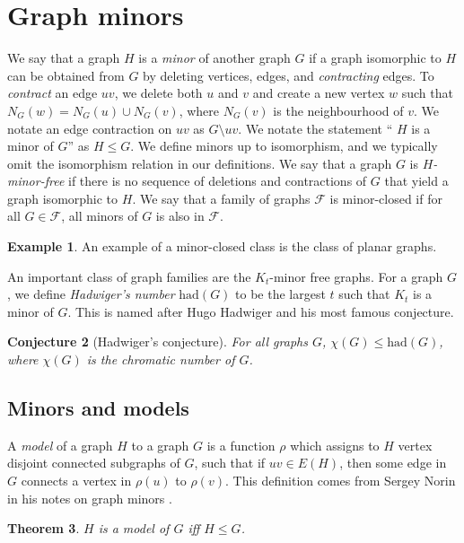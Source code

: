 \documentclass[]{report}
\newcommand{\had}{\text{had}}
\newtheorem{theorem}{Theorem}
\newtheorem{conjecture}[theorem]{Conjecture}
\theoremstyle{definition}
\newtheorem{example}[theorem]{Example}
\numberwithin{theorem}{section}
\numberwithin{equation}{section}
\begin{document}
\section{Graph minors}\label{sec:Graph Minors}
We say that a graph $H$ is a \textit{minor} of another graph $G$ if a graph isomorphic to $H$ can be obtained from $G$ by deleting vertices, edges, and \textit{contracting} edges. To \textit{contract} an edge $uv$, we delete both $u$ and $v$ and create a new vertex $w$ such that $N_G(w) = N_G(u) \cup N_G(v)$, where $N_G(v)$ is the neighbourhood of $v$. We notate an edge contraction on $uv$ as $G\setminus uv$.
We notate the statement `` $H$ is a minor of $G$'' as $H \leq G$. 
We define minors up to isomorphism, and we typically omit the isomorphism relation in our definitions. We say that a graph $G$ is \textit{$H$-minor-free} if there is no sequence of deletions and contractions of $G$ that yield a graph isomorphic to $H$. We say that a family of graphs $\mathcal{F}$ is minor-closed if for all $G \in \mathcal{F}$, all minors of $G$ is also in $\mathcal{F}$. 

\begin{example}
	An example of a minor-closed class is the class of planar graphs. 
\end{example}

An important class of graph families are the $K_t$-minor free graphs. For a graph $G$, we define \textit{Hadwiger's number} $\had(G)$ to be the largest $t$ such that $K_t$ is a minor of $G$. This is named after Hugo Hadwiger and his most famous conjecture.

\begin{conjecture}[Hadwiger's conjecture]\cite{hadwigerUeberKlassifikationStreckenkomplexe1943}
	For all graphs $G$, $\chi(G) \leq \had(G)$, where $\chi(G)$ is the \textit{chromatic number} of $G$. 
\end{conjecture}

\subsection{Minors and models}
A \textit{model} of a graph $H$ to a graph $G$ is a function $\rho$ which assigns to $H$ vertex disjoint connected subgraphs of $G$, such that if $uv \in E(H)$, then some edge in $G$ connects a vertex in $\rho(u)$ to $\rho(v)$. This definition comes from Sergey Norin in his notes on graph minors \cite{norinMath599GraphMinors2017}. 

\begin{theorem}
	$H$ is a model of $G$ iff $ H \leq G$. 
\end{theorem}
\end{document}
